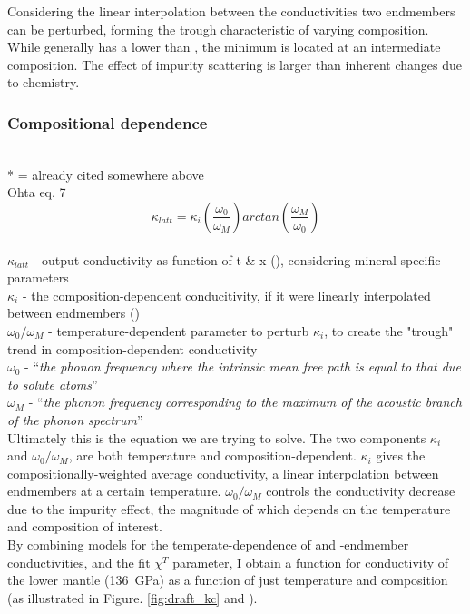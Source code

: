 Considering \citet{Ohta2017} the linear interpolation between the conductivities two endmembers can be perturbed, forming the trough characteristic of varying composition. While \fesios generally has a lower \tcs than \mgsio, the minimum is located at an intermediate composition. The effect of impurity scattering is larger than inherent changes due to chemistry.
    
\subsubsection{Compositional dependence}
\cite{Ohta2017}\\
* = already cited somewhere above\\

Ohta eq. 7 
\begin{equation}%
\kappa_{latt}=\kappa_{i}\left ( \frac{\omega_{0}}{\omega_{M}} \right )arctan\left ( \frac{\omega_{M}}{\omega_{0}} \right )
\label{eq.ohta7}
\end{equation}%
\\ $\kappa_{latt}$ - output conductivity as function of t \& x (\wmk), considering mineral specific parameters\\
$\kappa_{i}$ - the composition-dependent conducitivity, if it were linearly interpolated between endmembers (\wmk)\\
$\omega_{0}/\omega_{M}$ - temperature-dependent parameter to perturb $\kappa_{i}$, to create the "trough" trend in composition-dependent conductivity\\
$\omega_{0}$ - \enquote{\textit{the phonon frequency where the intrinsic mean free path is equal to that due to solute atoms}}\\
$\omega_{M}$ - \enquote{\textit{the phonon frequency corresponding to the maximum of the acoustic branch of the phonon spectrum}}\\

Ultimately this is the equation we are trying to solve. The two components $\kappa_{i}$ and $\omega_{0}/\omega_{M}$, are both temperature and composition-dependent. $\kappa_{i}$ gives the compositionally-weighted average conductivity, a linear interpolation between endmembers at a certain temperature. $\omega_{0}/\omega_{M}$ controls the conductivity decrease due to the impurity effect, the magnitude of which depends on the temperature and composition of interest.\\

By combining models for the temperate-dependence of \mgsios and \fesio-endmember conductivities, and the fit $\chi^{T}$ parameter, I obtain a function for conductivity of the lower mantle (136~GPa) as a function of just temperature and composition (as illustrated in Figure. \ref{fig:draft_kc} and ).

